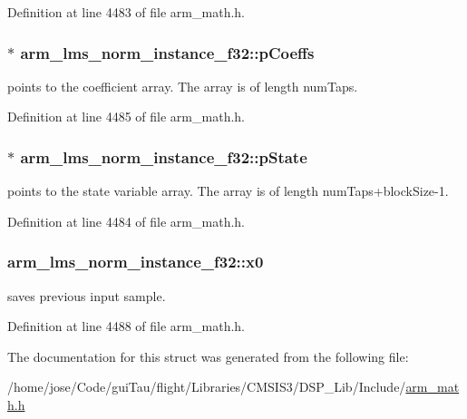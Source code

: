 Definition at line 4483 of file arm\-\_\-math.\-h.

\hypertarget{structarm__lms__norm__instance__f32_a1ba688d90aba7de003ed4ad8e2e7ddda}{
\subsubsection[{p\-Coeffs}]{$\ast$ arm\-\_\-lms\-\_\-norm\-\_\-instance\-\_\-f32\-::p\-Coeffs}}\label{structarm__lms__norm__instance__f32_a1ba688d90aba7de003ed4ad8e2e7ddda}
points to the coefficient array. The array is of length num\-Taps. 

Definition at line 4485 of file arm\-\_\-math.\-h.

\hypertarget{structarm__lms__norm__instance__f32_a0bc03338687002ed5f2e4a363eb095ec}{
\subsubsection[{p\-State}]{$\ast$ arm\-\_\-lms\-\_\-norm\-\_\-instance\-\_\-f32\-::p\-State}}\label{structarm__lms__norm__instance__f32_a0bc03338687002ed5f2e4a363eb095ec}
points to the state variable array. The array is of length num\-Taps+block\-Size-\/1. 

Definition at line 4484 of file arm\-\_\-math.\-h.

\hypertarget{structarm__lms__norm__instance__f32_aec958fe89b164a30f38bcca9f5d96218}{
\subsubsection[{x0}]{ arm\-\_\-lms\-\_\-norm\-\_\-instance\-\_\-f32\-::x0}}\label{structarm__lms__norm__instance__f32_aec958fe89b164a30f38bcca9f5d96218}
saves previous input sample. 

Definition at line 4488 of file arm\-\_\-math.\-h.



The documentation for this struct was generated from the following file\-:\begin{DoxyCompactItemize}
\item 
/home/jose/\-Code/gui\-Tau/flight/\-Libraries/\-C\-M\-S\-I\-S3/\-D\-S\-P\-\_\-\-Lib/\-Include/\hyperlink{arm__math_8h}{arm\-\_\-math.\-h}\end{DoxyCompactItemize}

